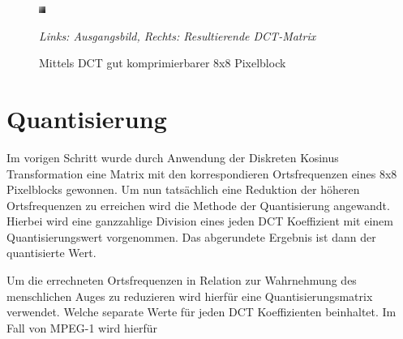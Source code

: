 \begin{figure}[h!]
    \centering
    \begin{multicols}{2}
    \includegraphics[scale=15]{images/2-2_dct_good.png}
    
    \end{multicols}
    \caption{Mittels DCT gut komprimierbarer 8x8 Pixelblock}
    \textit{Links: Ausgangsbild, Rechts: Resultierende DCT-Matrix}
    \label{fig:dct-good}
\end{figure}


\section{Quantisierung}

Im vorigen Schritt wurde durch Anwendung der Diskreten Kosinus Transformation eine Matrix mit den korrespondieren Ortsfrequenzen eines 8x8 Pixelblocks gewonnen. Um nun tatsächlich eine Reduktion der höheren Ortsfrequenzen zu erreichen wird die Methode der Quantisierung angewandt. Hierbei wird eine ganzzahlige Division eines jeden DCT Koeffizient mit einem Quantisierungswert vorgenommen. Das abgerundete Ergebnis ist dann der quantisierte Wert.


Um die errechneten Ortsfrequenzen in Relation zur Wahrnehmung des menschlichen Auges zu reduzieren wird hierfür eine Quantisierungsmatrix verwendet. Welche separate Werte für jeden DCT Koeffizienten beinhaltet. Im Fall von MPEG-1 wird hierfür 

